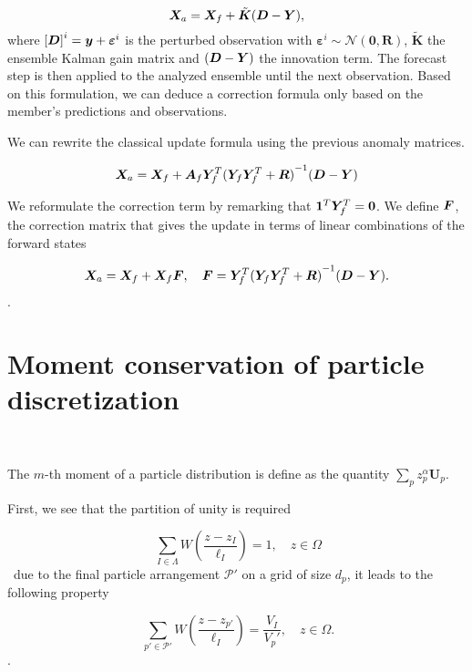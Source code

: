 \begin{equation} \label{enkf_formula}
    \bm{X}_a = \bm{X}_f + \tilde{\bm{K}} ( \bm{D} - \bm{Y}),
\end{equation}where ${[\bm{D}]}^i = \bm{y} + \bm{\varepsilon}^i$ is the perturbed observation with $\bm{\varepsilon}^i \sim \mathcal{N}(\bm{0}, \bm R) $, $\tilde{\bm{K}}$ the ensemble Kalman gain matrix and $( \bm{D} - \bm{Y})$ the innovation term.
The forecast step is then applied to the analyzed ensemble until the next observation.
Based on this formulation, we can deduce a correction formula only based on the member's predictions and observations.

We can rewrite the classical update formula using the previous anomaly matrices.

\begin{equation*}
    \bm{X}_a = \bm{X}_f + \bm A_f \bm Y_f^T {({\bm Y_f \bm Y_f^T + \bm R})}^{-1}(\bm{D} - \bm{Y})
\end{equation*}

We reformulate the correction term by remarking that $ \bm{1}^T  \bm Y_f^T = \bm{0}$. We define $\bm{F}$, the correction matrix that gives the update in terms of linear combinations of the forward states

\begin{equation}
    \bm{X}_a = \bm{X}_f + \bm{X}_f \bm{F}, \quad \bm{F} = \bm Y_f^T {(\bm Y_f \bm Y_f^T + \bm R)}^{-1}(\bm{D} - \bm{Y}).
\end{equation}.

\section{Moment conservation of particle discretization}~\label{appendix:moment_conservation}

The $m$-th moment of a particle distribution is define as the quantity $\sum_{p} z_p^{\alpha} \bm{U}_p$.

First, we see that the partition of unity is required

\begin{equation}~\label{eq:unity1}
    \sum_{I \in \Lambda} W\left(\frac{z - z_I}{\ell_I}\right) = 1 ,\quad z \in \Omega
\end{equation}~due to the final particle arrangement $\mathcal{P'}$ on a grid of size $d_p$, it leads to the following property

\begin{equation}~\label{eq:unity2}
    \sum_{p'\in\mathcal P'} W\left(\frac{z - z_{p'}}{\ell_I}\right) = \frac{V_I}{V_p'},\quad z \in \Omega.
\end{equation}.

